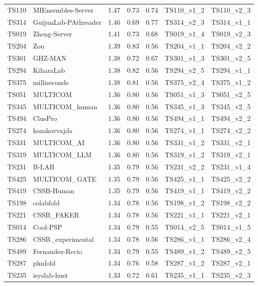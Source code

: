 \begin{longtable}{lllllll}
TS110 & MIEnsembles-Server & 1.47 & 0.73 & 0.74 & TS110\_v1\_2 & TS110\_v2\_3 \\ 
TS314 & GuijunLab-PAthreader & 1.46 & 0.69 & 0.77 & TS314\_v2\_3 & TS314\_v1\_1 \\ 
TS019 & Zheng-Server & 1.41 & 0.73 & 0.68 & TS019\_v1\_4 & TS019\_v2\_3 \\ 
TS204 & Zou & 1.39 & 0.83 & 0.56 & TS204\_v1\_1 & TS204\_v2\_2 \\ 
TS301 & GHZ-MAN & 1.38 & 0.72 & 0.67 & TS301\_v1\_3 & TS301\_v2\_5 \\ 
TS294 & KiharaLab & 1.38 & 0.82 & 0.56 & TS294\_v2\_5 & TS294\_v1\_1 \\ 
TS375 & milliseconds & 1.38 & 0.81 & 0.56 & TS375\_v2\_4 & TS375\_v1\_2 \\ 
TS051 & MULTICOM & 1.36 & 0.80 & 0.56 & TS051\_v1\_3 & TS051\_v2\_5 \\ 
TS345 & MULTICOM\_human & 1.36 & 0.80 & 0.56 & TS345\_v1\_3 & TS345\_v2\_5 \\ 
TS494 & ClusPro & 1.36 & 0.80 & 0.56 & TS494\_v1\_1 & TS494\_v2\_2 \\ 
TS274 & kozakovvajda & 1.36 & 0.80 & 0.56 & TS274\_v1\_1 & TS274\_v2\_2 \\ 
TS331 & MULTICOM\_AI & 1.36 & 0.80 & 0.56 & TS331\_v1\_2 & TS331\_v2\_1 \\ 
TS319 & MULTICOM\_LLM & 1.36 & 0.80 & 0.56 & TS319\_v1\_2 & TS319\_v2\_1 \\ 
TS231 & B-LAB & 1.35 & 0.79 & 0.56 & TS231\_v2\_2 & TS231\_v1\_4 \\ 
TS425 & MULTICOM\_GATE & 1.35 & 0.79 & 0.56 & TS425\_v1\_1 & TS425\_v2\_2 \\ 
TS419 & CSSB-Human & 1.35 & 0.79 & 0.56 & TS419\_v1\_1 & TS419\_v2\_2 \\ 
TS198 & colabfold & 1.34 & 0.78 & 0.56 & TS198\_v1\_2 & TS198\_v2\_2 \\ 
TS221 & CSSB\_FAKER & 1.34 & 0.78 & 0.56 & TS221\_v1\_1 & TS221\_v2\_1 \\ 
TS014 & Cool-PSP & 1.34 & 0.79 & 0.55 & TS014\_v2\_5 & TS014\_v1\_5 \\ 
TS286 & CSSB\_experimental & 1.34 & 0.78 & 0.56 & TS286\_v1\_1 & TS286\_v2\_4 \\ 
TS489 & Fernandez-Recio & 1.34 & 0.79 & 0.55 & TS489\_v1\_2 & TS489\_v2\_5 \\ 
TS287 & plmfold & 1.34 & 0.76 & 0.58 & TS287\_v1\_2 & TS287\_v2\_1 \\ 
TS235 & isyslab-hust & 1.33 & 0.72 & 0.61 & TS235\_v1\_1 & TS235\_v2\_3 \\ 

\end{longtable}
